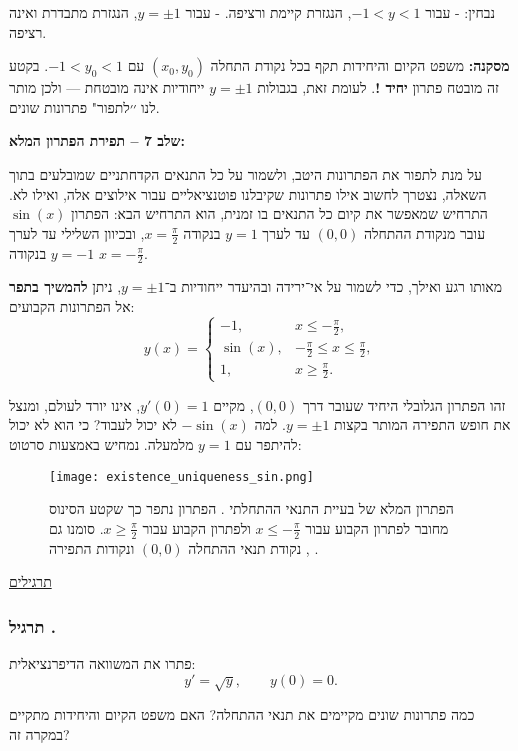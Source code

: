 \documentclass{article}
\numberwithin{equation}{section}
\newcounter{exercise}[section]
\renewcommand{\theexercise}{\thesection.\arabic{exercise}}
\newcommand{\exercise}[1][]{%
  \refstepcounter{exercise}%
  \subsubsection*{תרגיל \theexercise\; #1}%
  \label{ex:\theexercise}%
}
\begin{document}
נבחין:
- עבור $-1<y<1$, הנגזרת קיימת ורציפה.  
- עבור $y=\pm 1$, הנגזרת מתבדרת ואינה רציפה.  

\textbf{מסקנה:}  
משפט הקיום והיחידות תקף בכל נקודת התחלה $(x_0,y_0)$ עם $-1<y_0<1$.  
בקטע זה מובטח פתרון \textbf{יחיד !}.  
לעומת זאת, בגבולות $y=\pm 1$ ייחודיות אינה מובטחת — ולכן מותר לנו ׳׳לתפור" פתרונות שונים.

\textbf{שלב 7 – תפירת הפתרון המלא:}  

על מנת לתפור את הפתרונות היטב, ולשמור על כל התנאים הקדחתניים שמובלעים בתוך השאלה, נצטרך לחשוב אילו פתרונות שקיבלנו פוטנציאליים עבור אילוצים אלה, ואילו לא. התרחיש שמאפשר את קיום כל התנאים בו זמנית, הוא התרחיש הבא:
הפתרון $\sin(x)$ עובר מנקודת ההתחלה $(0,0)$ עד לערך $y=1$ בנקודה $x=\tfrac{\pi}{2}$, ובכיוון השלילי עד לערך $y=-1$ בנקודה $x=-\tfrac{\pi}{2}$.  

מאותו רגע ואילך, כדי לשמור על אי־ירידה ובהיעדר ייחודיות ב־$y=\pm 1$, ניתן \textbf{להמשיך בתפר} אל הפתרונות הקבועים:  
\[
\boxed{
y(x) = 
\begin{cases}
-1, & x \leq -\tfrac{\pi}{2}, \\[6pt]
\sin(x), & -\tfrac{\pi}{2}\leq x \leq \tfrac{\pi}{2}, \\[6pt]
1, & x \geq \tfrac{\pi}{2}.
\end{cases}
}
\]

זהו הפתרון הגלובלי היחיד שעובר דרך $(0,0)$, מקיים $y'(0)=1$, אינו יורד לעולם, ומנצל את חופש התפירה המותר בקצות $y=\pm 1$. למה $-\sin(x)$ לא יכול לעבוד? כי הוא לא יכול להיתפר עם $y=1$ מלמעלה. נמחיש באמצעות סרטוט:
\begin{figure}[H]
    \centering
    \texttt{[image: existence\_uniqueness\_sin.png]}
    \caption{הפתרון המלא של בעיית התנאי ההתחלתי 
    . 
    הפתרון נתפר כך שקטע הסינוס 
    מחובר לפתרון הקבוע 
    עבור $x\leq -\frac{\pi}{2}$ 
    ולפתרון הקבוע 
    עבור $x\geq \frac{\pi}{2}$. 
    סומנו גם נקודת תנאי ההתחלה $(0,0)$ ונקודות התפירה 
    , .}
    \label{fig:existence_uniqueness_sin}
\end{figure}


\newpage
\underline{תרגילים}
\exercise{}

פתרו את המשוואה הדיפרנציאלית:
\[
y' = \sqrt{y}, 
\qquad y(0)=0.
\]

כמה פתרונות שונים מקיימים את תנאי ההתחלה?  
האם משפט הקיום והיחידות מתקיים במקרה זה?
\end{document}
